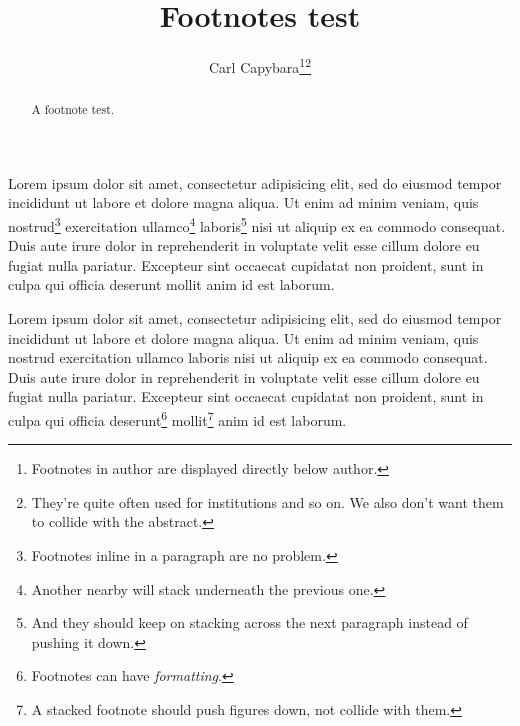 \documentclass{article}
\begin{document}
  \title{Footnotes test}
  \author{Carl Capybara\footnote{Footnotes in author are displayed directly below author.}\footnote{They're quite often used for institutions and so on. We also don't want them to collide with the abstract.}}
  \maketitle
  \begin{abstract}
    A footnote test.
  \end{abstract}
  Lorem ipsum dolor sit amet, consectetur adipisicing elit, sed do eiusmod tempor incididunt ut labore et dolore magna aliqua. Ut enim ad minim veniam, quis nostrud\footnote{Footnotes inline in a paragraph are no problem.} exercitation ullamco\footnote{Another nearby will stack underneath the previous one.} laboris\footnote{And they should keep on stacking across the next paragraph instead of pushing it down.} nisi ut aliquip ex ea commodo consequat. Duis aute irure dolor in reprehenderit in voluptate velit esse cillum dolore eu fugiat nulla pariatur. Excepteur sint occaecat cupidatat non proident, sunt in culpa qui officia deserunt mollit anim id est laborum.

  Lorem ipsum dolor sit amet, consectetur adipisicing elit, sed do eiusmod tempor incididunt ut labore et dolore magna aliqua. Ut enim ad minim veniam, quis nostrud exercitation ullamco laboris nisi ut aliquip ex ea commodo consequat. Duis aute irure dolor in reprehenderit in voluptate velit esse cillum dolore eu fugiat nulla pariatur. Excepteur sint occaecat cupidatat non proident, sunt in culpa qui officia deserunt\footnote{Footnotes can have \emph{formatting}.} mollit\footnote{A stacked footnote should push figures down, not collide with them.} anim id est laborum.
\end{document}
